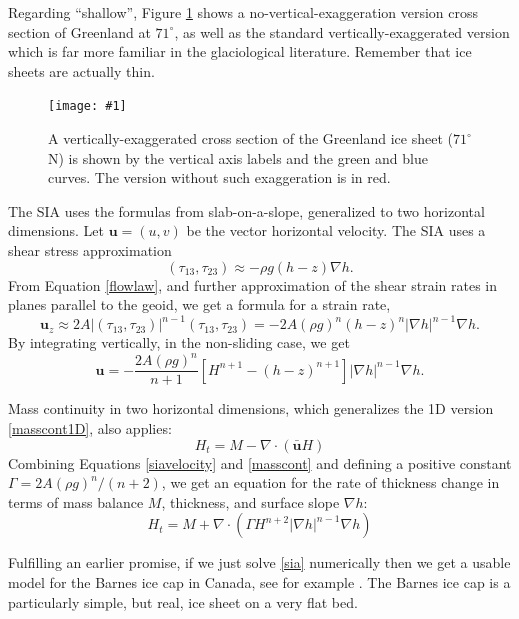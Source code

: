 \documentclass[titlepage,letterpaper,final,12pt]{scrartcl}
\newcommand{\grad}{\nabla}
\newcommand{\Div}{\nabla\cdot}
\newcommand{\onefigsize}[3]{
\begin{figure}[ht]
\centering
\texttt{[image: \#1]}
\caption{#2}
\label{fig:#1}
\end{figure}}
\newcommand{\onefig}[2]{\onefigsize{#1}{#2}{3.0in}}
\begin{document}
Regarding ``shallow'', Figure \ref{fig:green_transect} shows a no-vertical-exaggeration version cross section of Greenland at $71^\circ$, as well as the standard vertically-exaggerated version which is far more familiar in the glaciological literature.  Remember that ice sheets are actually thin.

\onefig{green_transect}{A vertically-exaggerated cross section of the Greenland ice sheet ($71^\circ$ N) is shown by the vertical axis labels and the green and blue curves.  The version without such exaggeration is in red.}

The SIA uses the formulas from slab-on-a-slope, generalized to two horizontal dimensions.  Let $\mathbf{u} = (u,v)$ be the vector horizontal velocity.  The SIA uses a shear stress approximation
	$$(\tau_{13},\tau_{23}) \approx - \rho g (h-z) \nabla h.$$
From Equation \eqref{flowlaw}, and further approximation of the shear strain rates in planes parallel to the geoid, we get a formula for a strain rate,
\begin{equation*}
\mathbf{u}_z \approx 2 A |(\tau_{13},\tau_{23})|^{n-1} (\tau_{13},\tau_{23}) = - 2 A (\rho g)^n (h-z)^n |\nabla h|^{n-1} \nabla h.
\end{equation*}
By integrating vertically, in the non-sliding case, we get
\begin{equation}
\mathbf{u} = - \frac{2 A (\rho g)^n}{n+1} \left[H^{n+1} - (h-z)^{n+1}\right] |\nabla h|^{n-1} \nabla h.  \label{siavelocity}
\end{equation}

Mass continuity in two horizontal dimensions, which generalizes the 1D version \eqref{masscont1D}, also applies:
\begin{equation}
    H_t = M - \Div\left(\bar{\mathbf{u}} H\right)  \label{masscont}
\end{equation}
Combining Equations \eqref{siavelocity} and \eqref{masscont} and defining a positive constant $\Gamma = 2 A (\rho g)^n / (n+2)$, we get an equation for the rate of thickness change in terms of mass balance $M$, thickness, and surface slope $\grad h$:
\begin{equation}
H_t = M + \Div \left(\Gamma H^{n+2} |\grad h|^{n-1} \grad h \right) \label{sia}
\end{equation}

Fulfilling an earlier promise, if we just solve \eqref{sia} numerically then we get a usable model for the Barnes ice cap in Canada, see for example \cite{Mahaffy}.  The Barnes ice cap is a particularly simple, but real, ice sheet on a very flat bed.
\end{document}
